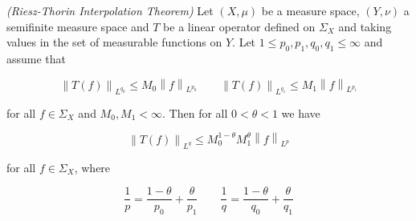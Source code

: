 \begin{mdframed}
	\begin{theorem}\emph{(Riesz-Thorin Interpolation Theorem)}
		Let $(X,\mu)$ be a measure space, $(Y,\nu)$ a semifinite measure space and $T$ be a linear operator defined on $\Sigma_X$ and taking values in the set of measurable functions on $Y$. Let $1 \leqslant p_0,p_1,q_0,q_1 \leqslant \infty$ and assume that

		\begin{equation}
			\left\|T(f)\right\|_{L^{q_0}} \leqslant M_0\left\|f\right\|_{L^{p_0}} \qquad \left\|T(f)\right\|_{L^{q_1}} \leqslant M_1\left\|f\right\|_{L^{p_1}}
		\end{equation}

		for all $f \in \Sigma_X$ and $M_0,M_1 < \infty$. Then for all $0 < \theta < 1$ we have

		\begin{equation}
			\left\|T(f)\right\|_{L^q} \leqslant M_0^{1 - \theta}M_1^\theta\left\|f\right\|_{L^p}
		\end{equation}

		for all $f \in \Sigma_X$, where

		\begin{equation}
			\frac{1}{p} = \frac{1 - \theta}{p_0} + \frac{\theta}{p_1} \qquad \frac{1}{q} = \frac{1 - \theta}{q_0} + \frac{\theta}{q_1}
		\end{equation}
		\label{thm:Riesz_Thorin}
	\end{theorem}
\end{mdframed}

